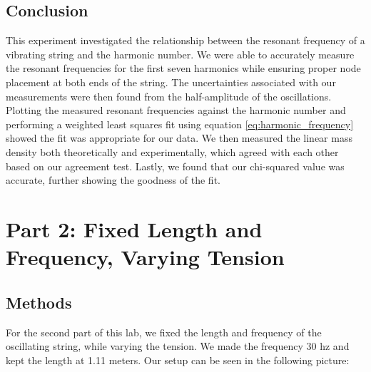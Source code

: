 \documentclass[11pt]{article}
\let\oldsection\section
\renewcommand\section{\clearpage\oldsection}
\begin{document}
    
    \subsection{Conclusion}\label{subsec:part_1_conclusion}
    This experiment investigated the relationship between the resonant frequency of a vibrating string and the harmonic number.
    We were able to accurately measure the resonant frequencies for the first seven harmonics while ensuring proper node placement at both ends of the string.
    The uncertainties associated with our measurements were then found from the half-amplitude of the oscillations.
    Plotting the measured resonant frequencies against the harmonic number and performing a weighted least squares fit using equation \ref{eq:harmonic_frequency} showed the fit was appropriate for our data.
    We then measured the linear mass density both theoretically and experimentally, which agreed with each other based on our agreement test.
    Lastly, we found that our chi-squared value was accurate, further showing the goodness of the fit.

    
    \section{Part 2: Fixed Length and Frequency, Varying Tension }\label{sec:part_2}


    \subsection{Methods}\label{subsec:part_2_methods}

    For the second part of this lab, we fixed the length and frequency of the oscillating string, while varying the tension.
    We made the frequency 30 hz and kept the length at 1.11 meters.
    Our setup can be seen in the following picture:
\end{document}
